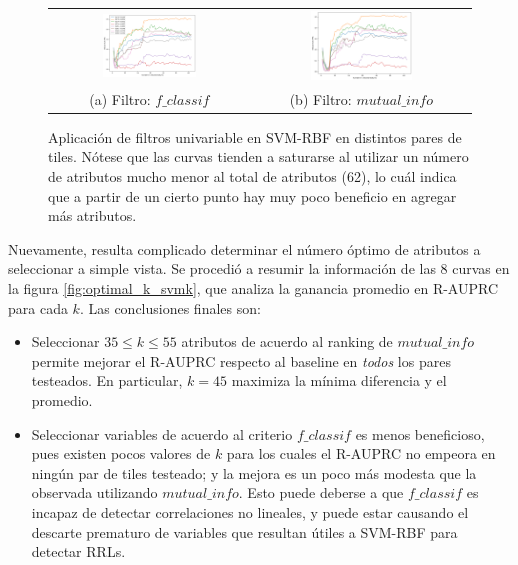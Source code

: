 \begin{figure}[h!]
\begin{tabular}{cc}
  \includegraphics[width=0.49\textwidth]{Kap5/rbf_f_classif_ALL_CURVES.png} &   \includegraphics[width=0.49\textwidth]{Kap5/rbf_mutual_info_classif_ALL_CURVES.png} \\
(a) Filtro: $f\_classif$ & (b) Filtro: $mutual\_info$
\end{tabular}
\caption{Aplicación de filtros univariable en SVM-RBF en distintos pares de tiles.  Nótese que las curvas tienden a saturarse al utilizar un número de atributos mucho menor al total de atributos (62), lo cuál indica que a partir de un cierto punto hay muy poco beneficio en agregar más atributos.}
\label{fig:svmk_univariate_unified}
\end{figure}

Nuevamente, resulta complicado determinar el número óptimo de atributos a seleccionar a simple vista. Se procedió a resumir la información de las 8 curvas en la figura \ref{fig:optimal_k_svmk}, que analiza la ganancia promedio en R-AUPRC para cada $k$. Las conclusiones finales son:

\begin{itemize}
\item Seleccionar $35 \leq k \leq 55$ atributos de acuerdo al ranking de $mutual\_info$ permite mejorar el R-AUPRC respecto al baseline en \textit{todos} los pares testeados. En particular, $k=45$ maximiza la mínima diferencia y el promedio.
\item Seleccionar variables de acuerdo al criterio $f\_classif$ es menos beneficioso, pues existen pocos valores de $k$ para los cuales el R-AUPRC no empeora en ningún par de tiles testeado; y la mejora es un poco más modesta que la observada utilizando $mutual\_info$. Esto puede deberse a que $f\_classif$ es incapaz de detectar correlaciones no lineales, y puede estar causando el descarte prematuro de variables que resultan útiles a SVM-RBF para detectar RRLs.
\end{itemize}

